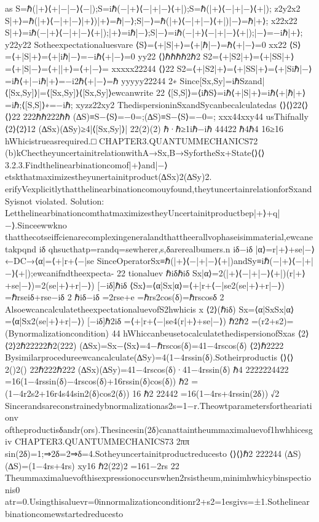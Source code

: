 {{as
S=ℏ(|+⟩⟨+|−|−⟩⟨−|);S=iℏ(−|+⟩⟨−|+|−⟩⟨+|);S=ℏ(|+⟩⟨−|+|−⟩⟨+|);
z2y2x2
S|+⟩=ℏ(|+⟩⟨−|+|−⟩|+⟩)|+⟩=ℏ|−⟩;S|−⟩=ℏ(|+⟩⟨−|+|−⟩⟨+|)|−⟩=ℏ|+⟩;
x22x22
S|+⟩=iℏ(−|+⟩⟨−|+|−⟩⟨+|);|+⟩=iℏ|−⟩;S|−⟩=iℏ(−|+⟩⟨−|+|−⟩⟨+|);|−⟩=−iℏ|+⟩;
y22y22
Sotheexpectationaluesvare
⟨S⟩=⟨+|S|+⟩=⟨+|ℏ|−⟩=ℏ⟨+|−⟩=0
xx22
⟨S⟩=⟨+|S|+⟩=⟨+|iℏ|−⟩=−iℏ⟨+|−⟩=0
yy22
⟨⟩ℏℏℏℏ2ℏ2
S2=⟨+|S2|+⟩=⟨+|SS|+⟩=⟨+|S|−⟩=⟨+||+⟩=⟨+|−⟩=
xxxxx22244
⟨⟩22
S2=⟨+|S2|+⟩=⟨+|SS|+⟩=⟨+|Siℏ|−⟩=iℏ⟨+|−iℏ|+⟩=−i2ℏ⟨+|−⟩=ℏ
yyyyy22244
2∗
Since[Sx,Sy]=iℏSzand|⟨[Sx,Sy]⟩|=⟨[Sx,Sy]⟩⟨[Sx,Sy]⟩ewcanwrite
22
⟨[S,S]⟩=⟨iℏS⟩=iℏ⟨+|S|+⟩=iℏ⟨+|ℏ|+⟩=iℏ;⟨[S,S]⟩∗=−iℏ;
xyzz22xy2
ThedispersioninSxandSycanbecalculatedas
⟨⟩⟨⟩22⟨⟩⟨⟩22
222ℏℏ222ℏℏ
(∆S)≡S−⟨S⟩=−0=;(∆S)≡S−⟨S⟩=−0=;
xxx44xxy44
usThifnally
⟨2⟩⟨2⟩12
(∆Sx)(∆Sy)≥4|⟨[Sx,Sy]⟩|
22(2)(2)
ℏ·ℏ≥1iℏ−iℏ
44422
ℏ4ℏ4
16≥16
hWhicistrueasrequired.□
CHAPTER3.QUANTUMMECHANICS72
(b)kChectheyuncertainitrelationwithA→Sx,B→SyfortheSx+State⟨⟩⟨⟩
3.2.3.Findthelinearbinationcomof|+⟩and|−⟩etskthatmaximizestheyunertainitproduct(∆Sx)2(∆Sy)2.
erifyVexplicitlythatthelinearbinationcomouyfound,theytuncertainrelationforSxandSyisnot
violated.
Solution:
LetthelinearbinationcomthatmaximizestheyUncertainitproductbep|+⟩+q|−⟩.Sinceewwkno
thatthecotseiffcienarecomplexingeneralandthattheerallvophaseisimmaterial,ewcanetakpqnd
iδ
qhsucthatp=randq=sewherer,s,δarerealbumers.n
iδ−iδ
|α⟩=r|+⟩+se|−⟩←DC→⟨α|=⟨+|r+⟨−|se
SinceOperatorSx≡ℏ(|+⟩⟨−|+|−⟩⟨+|)andSy≡iℏ(−|+⟩⟨−|+|−⟩⟨+|);ewcanifndtheexpecta-
22
tionaluev
ℏiδℏiδ
Sx|α⟩=2(|+⟩⟨−|+|−⟩⟨+|)(r|+⟩+se|−⟩)=2(se|+⟩+r|−⟩)
[−iδ]ℏiδ
⟨Sx⟩=⟨α|Sx|α⟩=⟨+|r+⟨−|se2(se|+⟩+r|−⟩)
=ℏ{rseiδ+rse−iδ}
2
ℏ{iδ−iδ}
=2rse+e
=ℏrs2cos(δ)=ℏrscosδ
2
AlsoewcancalculatetheexpectationaluevofS2hwhicis
x
⟨2⟩(ℏiδ)
Sx=⟨α|SxSx|α⟩=⟨α|Sx2(se|+⟩+r|−⟩)
[−iδ]ℏ2iδ
=⟨+|r+⟨−|se4(r|+⟩+se|−⟩)
ℏ2ℏ2
=(r2+s2)=(Bynormalizationcondition)
44
hWhiccanbeusetocalculatethedispersionofSxas
⟨2⟩⟨2⟩2ℏ22222ℏ2(222)
(∆Sx)=Sx−⟨Sx⟩=4−ℏrscos(δ)=41−4rscos(δ)
⟨2⟩ℏ2222
Bysimilarprocedureewcancalculate(∆Sy)=4(1−4rssin(δ).Sotheirproductis
⟨⟩⟨⟩2()2()
22ℏ222ℏ222
(∆Sx)(∆Sy)=41−4rscos(δ)·41−4rssin(δ)
ℏ4
2222224422
=16(1−4rssin(δ)−4rscos(δ)+16rssin(δ)cos(δ))
ℏ2
=(1−4r2s2+16r4s44sin2(δ)cos2(δ))
16
ℏ2
22442
=16(1−4rs+4rssin(2δ))
√2
Sincerandsareconstrainedybnormalizationas2s=1−r.Theowtparametersfortheariationv
oftheproductisδandr(ors).Thesincesin(2δ)canattaintheummaximaluevof1hwhhicesgiv
CHAPTER3.QUANTUMMECHANICS73
2ππ
sin(2δ)=1;⇒2δ=2⇒δ=4.Sotheyuncertainitproductreducesto
⟨⟩⟨⟩ℏ2
222244
(∆S)(∆S)=(1−4rs+4rs)
xy16
ℏ2(22)2
=161−2rs
22
Theummaximaluevofthisexpressionoccurswhen2rsistheum,minimhwhicybinspectionis0
atr=0.Usingthisaluevr=0innormalizationconditionr2+s2=1esgivs=±1.Sothelinear
binationcomewstartedreducesto
}}
